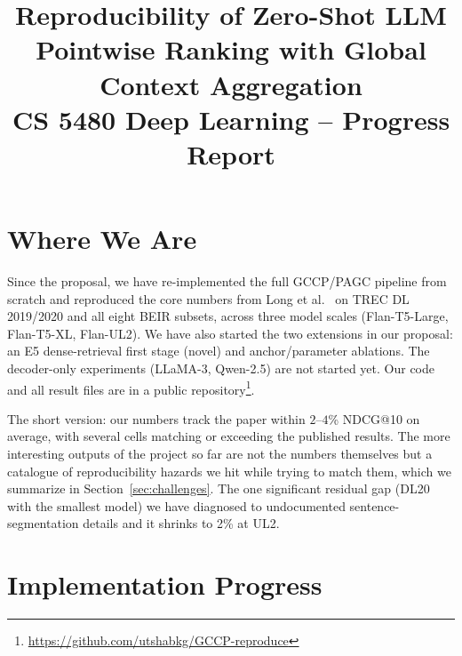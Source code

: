 \documentclass[conference]{IEEEtran}
\begin{document}
\title{Reproducibility of Zero-Shot LLM Pointwise Ranking with Global Context Aggregation\\[10pt]
\large CS 5480 Deep Learning -- Progress Report}

\author{
}

\maketitle
\thispagestyle{plain}
\pagestyle{plain}

\section{Where We Are}

Since the proposal, we have re-implemented the full GCCP/PAGC pipeline from scratch and reproduced the core numbers from Long et al.~\cite{long2025precise} on TREC DL 2019/2020 and all eight BEIR subsets, across three model scales (Flan-T5-Large, Flan-T5-XL, Flan-UL2). We have also started the two extensions in our proposal: an E5 dense-retrieval first stage (novel) and anchor/parameter ablations. The decoder-only experiments (LLaMA-3, Qwen-2.5) are not started yet. Our code and all result files are in a public repository\footnote{\url{https://github.com/utshabkg/GCCP-reproduce}}.

The short version: our numbers track the paper within $2$--$4$\% NDCG@10 on average, with several cells matching or exceeding the published results. The more interesting outputs of the project so far are not the numbers themselves but a catalogue of reproducibility hazards we hit while trying to match them, which we summarize in Section~\ref{sec:challenges}. The one significant residual gap (DL20 with the smallest model) we have diagnosed to undocumented sentence-segmentation details and it shrinks to 2\% at UL2.

\section{Implementation Progress}
\end{document}
